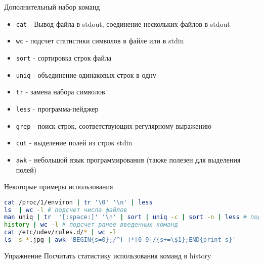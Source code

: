 \documentclass[ignorenonframetext, professionalfonts, hyperref={unicode}]{beamer}
\begin{document}
\begin{frame}{Дополнительный набор команд}
  \begin{itemize}
    \item {\tt cat} - Вывод файла в stdout, соединение нескольких файлов в stdout
    \item {\tt wc} - подсчет статистики символов в файле или в stdin 
    \item {\tt sort} - сортировка строк файла
    \item {\tt uniq} - объединение одинаковых строк в одну
    \item {\tt tr} - замена набора символов
    \item {\tt less} - программа-пейджер
    \item {\tt grep} - поиск строк, соответствующих регулярному выражению
    \item {\tt cut} - выделение полей из строк stdin
    \item {\tt awk} - небольшой язык программирования (также полезен для выделения полей)
  \end{itemize}
\end{frame}

\begin{frame}[fragile]{Некоторые примеры использования}
\begin{lstlisting}[language=bash]
cat /proc/1/environ | tr '\0' '\n' | less
ls  | wc -l # подсчет числа файлов
man uniq | tr  '[:space:]' '\n' | sort | uniq -c | sort -n | less # подсчет количества слов в тексте man uniq
history | wc -l # подсчет ранее введенных команд
cat /etc/udev/rules.d/* | wc -l
ls -s *.jpg | awk 'BEGIN{s=0};/^[ ]*[0-9]/{s+=\$1};END{print s}' 
\end{lstlisting}
  \pause
  \begin{block}{Упражнение}
    Посчитать статистику использования команд в history
  \end{block}
\end{frame}
\end{document}
